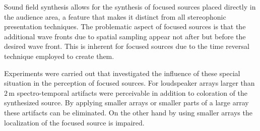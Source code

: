 Sound field synthesis allows for the synthesis of focused sources
placed directly in the audience area, a feature that makes it distinct from all
stereophonic presentation techniques. The problematic aspect of focused sources
is that the additional wave fronts due to spatial sampling appear not after but
before the desired wave front. This is inherent for focused sources due to the
time reversal technique employed to create them.

Experiments were carried out that investigated the influence of these special
situation in the perception of focused sources. For loudspeaker arrays larger
than $2$\,m spectro-temporal artifacts were perceivable in addition to
coloration of the synthesized source. By applying smaller arrays or smaller
parts of a large array these artifacts can be eliminated. On the other hand
by using smaller arrays the localization of the focused source is impaired.
